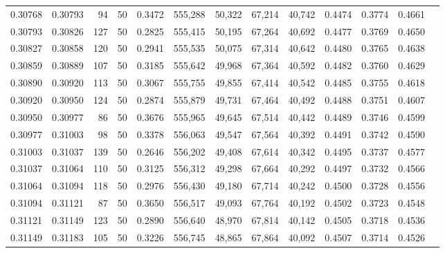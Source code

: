 \begin{tabular}{rrrrrrrrrrrrr}
0.30768 & 0.30793 &    94 &  50 &                                     0.3472 & 555,288 &  50,322 &  67,214 &  40,742 & 0.4474 & 0.3774 & 0.4661 \\
0.30793 & 0.30826 &   127 &  50 &                                     0.2825 & 555,415 &  50,195 &  67,264 &  40,692 & 0.4477 & 0.3769 & 0.4650 \\
0.30827 & 0.30858 &   120 &  50 &                                     0.2941 & 555,535 &  50,075 &  67,314 &  40,642 & 0.4480 & 0.3765 & 0.4638 \\
0.30859 & 0.30889 &   107 &  50 &                                     0.3185 & 555,642 &  49,968 &  67,364 &  40,592 & 0.4482 & 0.3760 & 0.4629 \\
0.30890 & 0.30920 &   113 &  50 &                                     0.3067 & 555,755 &  49,855 &  67,414 &  40,542 & 0.4485 & 0.3755 & 0.4618 \\
0.30920 & 0.30950 &   124 &  50 &                                     0.2874 & 555,879 &  49,731 &  67,464 &  40,492 & 0.4488 & 0.3751 & 0.4607 \\
0.30950 & 0.30977 &    86 &  50 &                                     0.3676 & 555,965 &  49,645 &  67,514 &  40,442 & 0.4489 & 0.3746 & 0.4599 \\
0.30977 & 0.31003 &    98 &  50 &                                     0.3378 & 556,063 &  49,547 &  67,564 &  40,392 & 0.4491 & 0.3742 & 0.4590 \\
0.31003 & 0.31037 &   139 &  50 &                                     0.2646 & 556,202 &  49,408 &  67,614 &  40,342 & 0.4495 & 0.3737 & 0.4577 \\
0.31037 & 0.31064 &   110 &  50 &                                     0.3125 & 556,312 &  49,298 &  67,664 &  40,292 & 0.4497 & 0.3732 & 0.4566 \\
0.31064 & 0.31094 &   118 &  50 &                                     0.2976 & 556,430 &  49,180 &  67,714 &  40,242 & 0.4500 & 0.3728 & 0.4556 \\
0.31094 & 0.31121 &    87 &  50 &                                     0.3650 & 556,517 &  49,093 &  67,764 &  40,192 & 0.4502 & 0.3723 & 0.4548 \\
0.31121 & 0.31149 &   123 &  50 &                                     0.2890 & 556,640 &  48,970 &  67,814 &  40,142 & 0.4505 & 0.3718 & 0.4536 \\
0.31149 & 0.31183 &   105 &  50 &                                     0.3226 & 556,745 &  48,865 &  67,864 &  40,092 & 0.4507 & 0.3714 & 0.4526 \\

\end{tabular}

